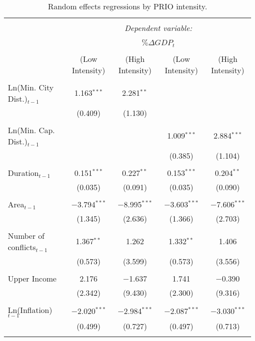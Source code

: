 \begin{table}[!htbp] \centering 
  \caption{Random effects regressions by PRIO intensity. } 
  \label{tab:modHiLoIntensity} 
\footnotesize{
\begin{tabular}{@{\extracolsep{5pt}}lcccc} 
\\[-1.8ex]\hline 
\hline \\[-1.8ex] 
 & \multicolumn{4}{c}{\textit{Dependent variable:}} \\ 
\cline{2-5} 
\\[-1.8ex] & \multicolumn{4}{c}{$\% \Delta GDP_{t}$} \\ 
\\[-1.8ex] & (Low Intensity) & (High Intensity) & (Low Intensity) & (High Intensity)\\ 
\hline \\[-1.8ex] 
 Ln(Min. City Dist.)$_{t-1}$ & 1.163$^{***}$ & 2.281$^{**}$ &  &  \\ 
  & (0.409) & (1.130) &  &  \\ 
  & & & & \\ 
 Ln(Min. Cap. Dist.)$_{t-1}$ &  &  & 1.009$^{***}$ & 2.884$^{***}$ \\ 
  &  &  & (0.385) & (1.104) \\ 
  & & & & \\ 
 Duration$_{t-1}$ & 0.151$^{***}$ & 0.227$^{**}$ & 0.153$^{***}$ & 0.204$^{**}$ \\ 
  & (0.035) & (0.091) & (0.035) & (0.090) \\ 
  & & & & \\ 
 Area$_{t-1}$ & $-$3.794$^{***}$ & $-$8.995$^{***}$ & $-$3.603$^{***}$ & $-$7.606$^{***}$ \\ 
  & (1.345) & (2.636) & (1.366) & (2.703) \\ 
  & & & & \\ 
 Number of conflicts$_{t-1}$ & 1.367$^{**}$ & 1.262 & 1.332$^{**}$ & 1.406 \\ 
  & (0.573) & (3.599) & (0.573) & (3.556) \\ 
  & & & & \\ 
 Upper Income & 2.176 & $-$1.637 & 1.741 & $-$0.390 \\ 
  & (2.342) & (9.430) & (2.300) & (9.316) \\ 
  & & & & \\ 
 Ln(Inflation)$_{t-1}$ & $-$2.020$^{***}$ & $-$2.984$^{***}$ & $-$2.087$^{***}$ & $-$3.030$^{***}$ \\ 
  & (0.499) & (0.727) & (0.497) & (0.713) \\ 
  & & & & \\ 

\end{tabular}}
\end{table}
